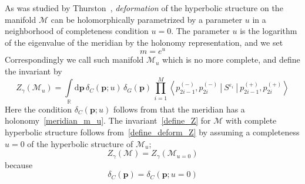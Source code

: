 \documentclass[12pt,reqno]{amsart}
\newcommand{\middle}{{}}
\numberwithin{equation}{section}
\begin{document}
As was studied by Thurston~\cite{WPThurs86a},
\emph{deformation}   of the hyperbolic structure on the manifold
$\mathcal{M}$ can be holomorphically parametrized by a parameter $u$
in a neighborhood of completeness condition $u=0$.
The parameter $u$
is the logarithm of the
eigenvalue of the meridian by the holonomy representation, and
we set
\begin{equation}
  \label{meridian_m_u}
  m= e^u
\end{equation}
Correspondingly  we call such  manifold $\mathcal{M}_u$ which is no
more complete,
and define the invariant by
\begin{equation}
  \label{define_deform_Z}
  Z_\gamma(\mathcal{M}_u)
  =
  \int\limits_\mathbb{R}
  \mathrm{d} \boldsymbol{p} \,
  \delta_C(\boldsymbol{p}; u) \,
  \delta_G(\boldsymbol{p}) \,
  \prod_{i=1}^M 
  \left\langle
    p_{2i-1}^{(-)}, p_{2 i}^{(-)}
    ~ \middle| ~ S^{\varepsilon_i}
    ~ \middle| ~ 
    p_{2i-1}^{(+)}, p_{2 i}^{(+)}
  \right\rangle 
\end{equation}
Here the condition
$\delta_C(\boldsymbol{p} ; u)$
follows from that the meridian has a holonomy~\eqref{meridian_m_u}.
The invariant~\eqref{define_Z} for $\mathcal{M}$ with complete
hyperbolic structure follows
from~\eqref{define_deform_Z} by assuming a completeness 
$u=0$ of the
hyperbolic structure of $\mathcal{M}_u$;
\begin{equation}
  Z_\gamma(\mathcal{M})
  =
  Z_\gamma \left( \mathcal{M}_{u=0} \right)
\end{equation}
because
\begin{equation}
  \delta_C(\boldsymbol{p})
  =
  \delta_C(\boldsymbol{p} ; u=0)
\end{equation}
\end{document}
